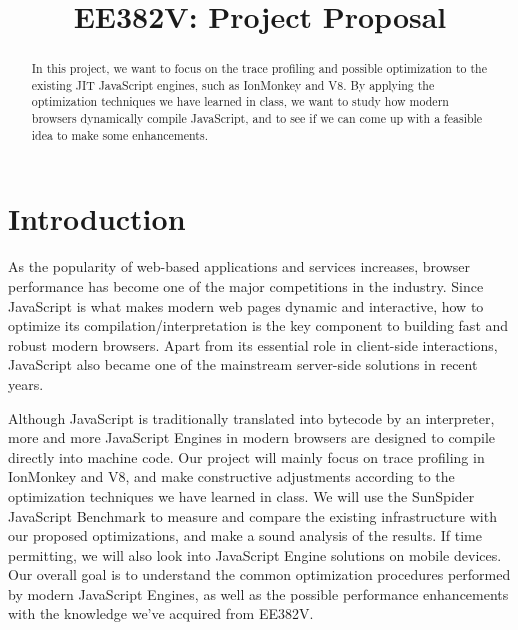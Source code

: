 \documentclass[conference]{IEEEtran}
\begin{document}
\title{EE382V: Project Proposal}

\author{
\and
{}
}

\maketitle

\begin{abstract}
In this project, we want to focus on the trace profiling and possible optimization to the existing JIT JavaScript engines, such as IonMonkey and V8. By applying the optimization techniques we have learned in class, we want to study how modern browsers dynamically compile JavaScript, and to see if we can come up with a feasible idea to make some enhancements.

\end{abstract}

\section{Introduction}
As the popularity of web-based applications and services increases, browser performance has become one of the major competitions in the industry. Since JavaScript is what makes modern web pages dynamic and interactive, how to optimize its compilation/interpretation is the key component to building fast and robust modern browsers. Apart from its essential role in client-side interactions, JavaScript also became one of the mainstream server-side solutions in recent years\cite{node}. 

Although JavaScript is traditionally translated into bytecode by an interpreter, more and more JavaScript Engines in modern browsers  are designed to compile directly into machine code. Our project will mainly focus on trace profiling\cite{Trace} in IonMonkey and V8, and make constructive adjustments according to the optimization techniques we have learned in class. We will use the SunSpider JavaScript Benchmark to measure and compare the existing infrastructure with our proposed optimizations, and make a sound analysis of the results. If time permitting, we will also look into JavaScript Engine solutions on mobile devices. Our overall goal is to understand the common optimization procedures performed by modern JavaScript Engines, as well as the possible performance enhancements with the knowledge we've acquired from EE382V. 
\end{document}
